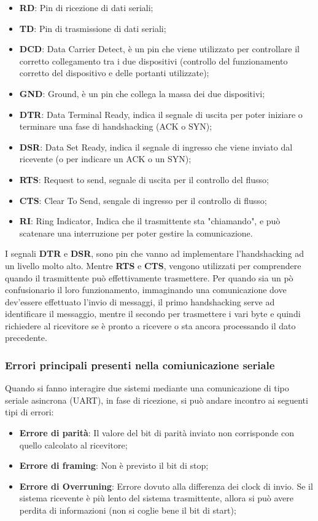 \begin{itemize}
    \item \textbf{RD}: Pin di ricezione di dati seriali;
    \item \textbf{TD}: Pin di trasmissione di dati seriali;
    \item \textbf{DCD}: Data Carrier Detect, è un pin che viene utilizzato per controllare il corretto collegamento tra i due dispositivi (controllo del funzionamento corretto del dispositivo e delle portanti utilizzate);
    \item \textbf{GND}: Ground, è un pin che collega la massa dei due dispositivi;
    \item \textbf{DTR}: Data Terminal Ready, indica il segnale di uscita per poter iniziare o terminare una fase di handshacking (ACK o SYN);
    \item \textbf{DSR}: Data Set Ready, indica il segnale di ingresso che viene inviato dal ricevente (o per indicare un ACK o un SYN);
    \item \textbf{RTS}: Request to send, segnale di uscita per il controllo del flusso;
    \item \textbf{CTS}: Clear To Send, sengale di ingresso per il controllo di flusso;
    \item \textbf{RI}: Ring Indicator, Indica che il trasmittente sta "chiamando", e può scatenare una interruzione per poter gestire la comunicazione.
\end{itemize}
I segnali \textbf{DTR} e \textbf{DSR}, sono pin che vanno ad implementare l'handshacking ad un livello molto alto. Mentre \textbf{RTS} e \textbf{CTS}, vengono utilizzati per comprendere quando il trasmittente può effettivamente trasmettere. Per quando sia un pò confusionario il loro funzionamento, immaginando una comunicazione dove dev'essere effettuato l'invio di messaggi, il primo handshacking serve ad identificare il messaggio, mentre il secondo per trasmettere i vari byte e quindi richiedere al ricevitore se è pronto a ricevere o sta ancora processando il dato precedente.

\subsubsection{Errori principali presenti nella comiunicazione seriale}
Quando si fanno interagire due sistemi mediante una comunicazione di tipo seriale asincrona (UART), in fase di ricezione, si può andare incontro ai seguenti tipi di errori:
\begin{itemize}
    \item \textbf{Errore di parità}: Il valore del bit di parità inviato non corrisponde con quello calcolato al ricevitore;
    \item \textbf{Errore di framing}: Non è previsto il bit di stop;
    \item \textbf{Errore di Overruning}: Errore dovuto alla differenza dei clock di invio. Se il sistema ricevente è più lento del sistema trasmittente, allora si può avere perdita di informazioni (non si coglie bene il bit di start);
\end{itemize}


